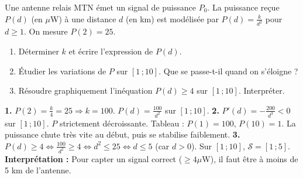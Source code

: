 \documentclass[11pt]{article}
\begin{document}
\begin{exercice}
Une antenne relais MTN émet un signal de puissance $P_0$. La puissance reçue $P(d)$ (en $\mu$W) à une distance $d$ (en km) est modélisée par $P(d)=\frac{k}{d^2}$ pour $d\ge1$. On mesure $P(2)=25$.
\begin{enumerate}
\item Déterminer $k$ et écrire l'expression de $P(d)$.
\item Étudier les variations de $P$ sur $[1\,;10]$. Que se passe-t-il quand on s'éloigne ?
\item Résoudre graphiquement l'inéquation $P(d)\geq 4$ sur $[1\,;10]$. Interpréter.
\end{enumerate}
\end{exercice}

\begin{corrige}
\textbf{1.} $P(2)=\frac{k}{4}=25 \Rightarrow k=100$. $P(d)=\frac{100}{d^2}$ sur $[1\,;10]$.
\textbf{2.} $P'(d)=-\frac{200}{d^3}<0$ sur $[1\,;10]$. $P$ strictement décroissante.
Tableau : $P(1)=100$, $P(10)=1$. La puissance chute très vite au début, puis se stabilise faiblement.
\textbf{3.} $P(d)\ge4 \iff \frac{100}{d^2}\ge4 \iff d^2\le25 \iff d\le5$ (car $d>0$).
Sur $[1\,;10]$, $\mathcal{S}=[1\,;5]$.
\textbf{Interprétation :} Pour capter un signal correct ($\ge4\mu$W), il faut être à moins de 5 km de l'antenne.
\end{corrige}
\end{document}

